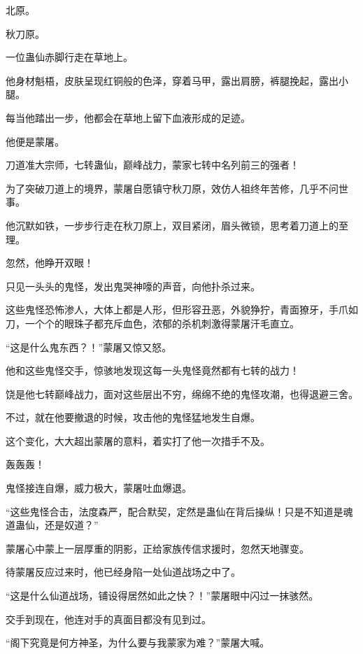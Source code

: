 
\begin{this_body}



北原。

秋刀原。

一位蛊仙赤脚行走在草地上。

他身材魁梧，皮肤呈现红铜般的色泽，穿着马甲，露出肩膀，裤腿挽起，露出小腿。

每当他踏出一步，他都会在草地上留下血液形成的足迹。

他便是蒙屠。

刀道准大宗师，七转蛊仙，巅峰战力，蒙家七转中名列前三的强者！

为了突破刀道上的境界，蒙屠自愿镇守秋刀原，效仿人祖终年苦修，几乎不问世事。

他沉默如铁，一步步行走在秋刀原上，双目紧闭，眉头微锁，思考着刀道上的至理。

忽然，他睁开双眼！

只见一头头的鬼怪，发出鬼哭神嚎的声音，向他扑杀过来。

这些鬼怪恐怖渗人，大体上都是人形，但形容丑恶，外貌狰狞，青面獠牙，手爪如刀，一个个的眼珠子都充斥血色，浓郁的杀机刺激得蒙屠汗毛直立。

“这是什么鬼东西？！”蒙屠又惊又怒。

他和这些鬼怪交手，惊骇地发现这每一头鬼怪竟然都有七转的战力！

饶是他七转巅峰战力，面对这些层出不穷，绵绵不绝的鬼怪攻潮，也得退避三舍。

不过，就在他要撤退的时候，攻击他的鬼怪猛地发生自爆。

这个变化，大大超出蒙屠的意料，着实打了他一次措手不及。

轰轰轰！

鬼怪接连自爆，威力极大，蒙屠吐血爆退。

“这些鬼怪合击，法度森严，配合默契，定然是蛊仙在背后操纵！只是不知道是魂道蛊仙，还是奴道？”

蒙屠心中蒙上一层厚重的阴影，正给家族传信求援时，忽然天地骤变。

待蒙屠反应过来时，他已经身陷一处仙道战场之中了。

“这是什么仙道战场，铺设得居然如此之快？！”蒙屠眼中闪过一抹骇然。

交手到现在，他连对手的真面目都没有见到过。

“阁下究竟是何方神圣，为什么要与我蒙家为难？”蒙屠大喊。


\end{this_body}
